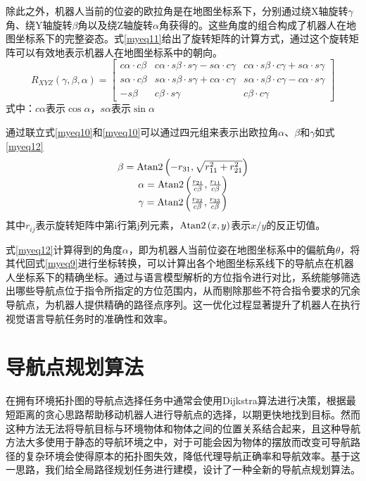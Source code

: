 除此之外，机器人当前的位姿的欧拉角是在地图坐标系下，分别通过绕X轴旋转$\gamma$角、绕Y轴旋转$\beta$角以及绕Z轴旋转$\alpha$角获得的。这些角度的组合构成了机器人在地图坐标系下的完整姿态。式\ref{myeq11}给出了旋转矩阵的计算方式，通过这个旋转矩阵可以有效地表示机器人在地图坐标系中的朝向。
\begin{equation}
	{R_{XYZ}}\left( {\gamma ,\beta ,\alpha } \right) = \left[ {\begin{array}{*{20}{c}}
		{c\alpha  \cdot c\beta }&{c\alpha  \cdot s\beta  \cdot s\gamma  - s\alpha  \cdot c\gamma }&{c\alpha  \cdot s\beta  \cdot c\gamma  + s\alpha  \cdot s\gamma }\\
		{s\alpha  \cdot c\beta }&{s\alpha  \cdot s\beta  \cdot s\gamma  + c\alpha  \cdot c\gamma }&{s\alpha  \cdot s\beta  \cdot c\gamma  - c\alpha  \cdot s\gamma }\\
		{ - s\beta }&{c\beta  \cdot s\gamma }&{c\beta  \cdot c\gamma }
		\end{array}} \right]
	\label{myeq11}
\end{equation}
式中：${c\alpha }$表示$\cos \alpha $，${s\alpha }$表示$\sin \alpha $

通过联立式\ref{myeq10}和\ref{myeq10}可以通过四元组来表示出欧拉角$\alpha $、$\beta $和$\gamma $如式\ref{myeq12}
\begin{equation}
	\begin{array}{c}
\beta  = {\rm{Atan2}}\left( { - {r_{31}},\sqrt {r_{11}^2 + r_{21}^2} } \right)\\
\alpha  = {\rm{Atan2}}\left( {\frac{{{r_{21}}}}{{c\beta }},\frac{{{r_{11}}}}{{c\beta }}} \right)\\
\gamma  = {\rm{Atan2}}\left( {\frac{{{r_{32}}}}{{c\beta }},\frac{{{r_{33}}}}{{c\beta }}} \right)
\end{array}
\label{myeq12}
\end{equation}
其中${{r_{ij}}}$表示旋转矩阵中第i行第j列元素，${\rm{Atan2}}\left( {x,y} \right)$表示$x/y$的反正切值。

式\ref{myeq12}计算得到的角度$\alpha$，即为机器人当前位姿在地图坐标系中的偏航角$\theta$，将其代回式\ref{myeq9}进行坐标转换，可以计算出各个地图坐标系线下的导航点在机器人坐标系下的精确坐标。通过与语言模型解析的方位指令进行对比，系统能够筛选出哪些导航点位于指令所指定的方位范围内，从而剔除那些不符合指令要求的冗余导航点，为机器人提供精确的路径点序列。这一优化过程显著提升了机器人在执行视觉语言导航任务时的准确性和效率。



\section{导航点规划算法}
在拥有环境拓扑图的导航点选择任务中通常会使用Dijkstra算法进行决策，根据最短距离的贪心思路帮助移动机器人进行导航点的选择，以期更快地找到目标。然而这种方法无法将导航目标与环境物体和物体之间的位置关系结合起来，且这种导航方法大多使用于静态的导航环境之中，对于可能会因为物体的摆放而改变可导航路径的复杂环境会使得原本的拓扑图失效，降低代理导航正确率和导航效率。基于这一思路，我们给全局路径规划任务进行建模，设计了一种全新的导航点规划算法。

